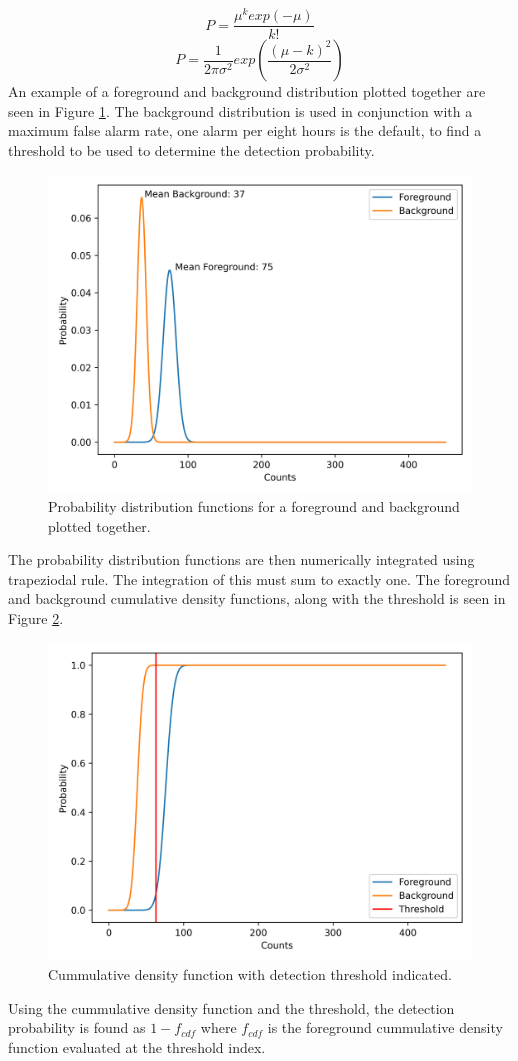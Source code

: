 	\begin{equation}
		P=\frac{\mu^kexp\left(-\mu\right)}{k!}
		\label{eq:poisson}
	\end{equation}
	\begin{equation}
		P=\frac{1}{2\pi\sigma^2}exp\left(\frac{\left(\mu-k\right)^2}{2\sigma^2}\right)
		\label{eq:gaussian}
		\end{equation}
	An example of a foreground and background distribution plotted together are seen in Figure \ref{fig:pdf}. The background distribution is used in conjunction with a maximum false alarm rate, one alarm per eight hours is the default, to find a threshold to be used to determine the detection probability. \\
	
	\begin{figure}[h!]
		\centering
		\includegraphics[width=0.6\linewidth]{pdf.png}
		\caption{Probability distribution functions for a foreground and background plotted together.}
		\label{fig:pdf}
	\end{figure}
	The probability distribution functions are then numerically integrated using trapeziodal rule. The integration of this must sum to exactly one. The foreground and background cumulative density functions, along with the threshold is seen in Figure \ref{fig:cdf}.\\
	\begin{figure}[h!]
		\centering
		\includegraphics[width=0.6\linewidth]{cdf.png}
		\caption{Cummulative density function with detection threshold indicated.}
		\label{fig:cdf}
	\end{figure}
Using the cummulative density function and the threshold, the detection probability is found as $1-f_{cdf}$ where $f_{cdf}$ is the foreground cummulative density function evaluated at the threshold index. 
